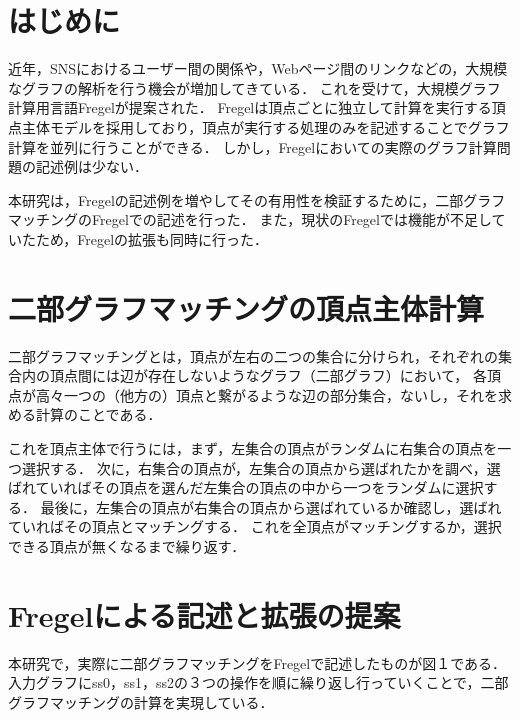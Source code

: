 \documentclass{AIabst}
\begin{document}
\makeAbstHeader
%
%
%
\section{はじめに}
近年，SNSにおけるユーザー間の関係や，Webページ間のリンクなどの，大規模なグラフの解析を行う機会が増加してきている．
これを受けて，大規模グラフ計算用言語Fregelが提案された\cite{DBLP:conf/icfp/EmotoMHMI16}．
Fregelは頂点ごとに独立して計算を実行する頂点主体モデルを採用しており，頂点が実行する処理のみを記述することでグラフ計算を並列に行うことができる．
しかし，Fregelにおいての実際のグラフ計算問題の記述例は少ない．

本研究は，Fregelの記述例を増やしてその有用性を検証するために，二部グラフマッチングのFregelでの記述を行った．
また，現状のFregelでは機能が不足していたため，Fregelの拡張も同時に行った．

\section{二部グラフマッチングの頂点主体計算}
二部グラフマッチングとは，頂点が左右の二つの集合に分けられ，それぞれの集合内の頂点間には辺が存在しないようなグラフ（二部グラフ）において，
各頂点が高々一つの（他方の）頂点と繋がるような辺の部分集合，ないし，それを求める計算のことである．

これを頂点主体で行うには，まず，左集合の頂点がランダムに右集合の頂点を一つ選択する．
次に，右集合の頂点が，左集合の頂点から選ばれたかを調べ，選ばれていればその頂点を選んだ左集合の頂点の中から一つをランダムに選択する．
最後に，左集合の頂点が右集合の頂点から選ばれているか確認し，選ばれていればその頂点とマッチングする．
これを全頂点がマッチングするか，選択できる頂点が無くなるまで繰り返す．

\section{Fregelによる記述と拡張の提案}
本研究で，実際に二部グラフマッチングをFregelで記述したものが図１である．
入力グラフにss0，ss1，ss2の３つの操作を順に繰り返し行っていくことで，二部グラフマッチングの計算を実現している．
\end{document}
